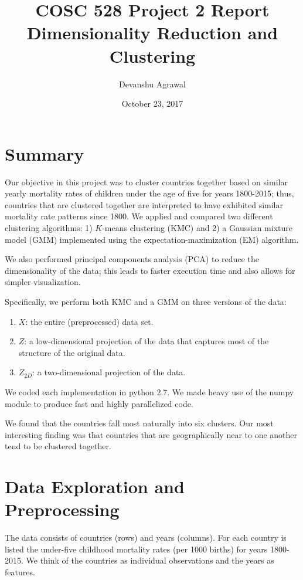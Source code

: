\documentclass[12pt]{article}
\title{COSC 528 Project 2 Report \\
Dimensionality Reduction and Clustering }
\author{Devanshu Agrawal}
\date{October 23, 2017}
\begin{document}
\maketitle

\section{Summary}

Our objective in this project was to cluster countries together based on similar yearly mortality rates of children under the age of five for years 1800-2015; thus, countries that are clustered together are interpreted to have exhibited similar mortality rate patterns since 1800. We applied and compared two different clustering algorithms: 1) $K$-means clustering (KMC) and 2) a Gaussian mixture model (GMM) implemented using the expectation-maximization (EM) algorithm.

We also performed principal components analysis (PCA) to reduce the dimensionality of the data; this leads to faster execution time and also allows for simpler visualization.

Specifically, we perform both KMC and a GMM on three versions of the data:
\begin{enumerate}
\item $X$: the entire (preprocessed) data set.
\item $Z$: a low-dimensional projection of the data that captures most of the structure of the original data.
\item $Z_{2D}$: a two-dimensional projection of the data.
\end{enumerate}
We coded each implementation in python 2.7. We made heavy use of the numpy module to produce fast and highly parallelized code.

We found that the countries fall most naturally into six clusters. Our most interesting finding was that countries that are geographically near to one another tend to be clustered together.


\section{Data Exploration and Preprocessing}

The data consists of countries (rows) and years (columns). For each country is listed the under-five childhood mortality rates (per 1000 births) for years 1800-2015. We think of the countries as individual observations and the years as features.
\end{document}
